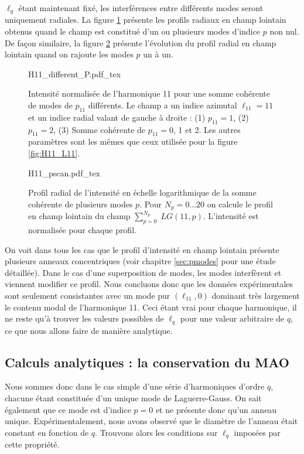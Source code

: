 $\ell_q$ étant maintenant fixé, les interférences entre différents modes seront uniquement radiales. 
La figure \ref{Fig:H11_pmodes} présente les profils radiaux en champ lointain obtenus quand le champ est constitué d'un ou plusieurs modes d'indice $p$ non nul. De façon similaire, la figure \ref{Fig:H11_pscan} présente l'évolution du profil radial en champ lointain quand on rajoute les modes $p$ un à un.


\begin{figure}[!ht]
\centering
\def\svgwidth{\columnwidth}
{H11_different_P.pdf_tex}
\caption{Intensité normalisée de l'harmonique 11 pour une somme cohérente de modes de $p_{11}$ différents. Le champ a un indice azimutal $\ell_{11} = 11$ et un indice radial valant de gauche à droite : (1) $p_{11} = 1$, (2) $p_{11} = 2$, (3) Somme cohérente de $p_{11} = 0$, 1 et 2. Les autres paramètres sont les mêmes que ceux utilisée pour la figure \ref{fig:H11_L11}.}
\label{Fig:H11_pmodes}
\end{figure}

\begin{figure}[!ht]
\centering
\def\svgwidth{\columnwidth}
{H11_pscan.pdf_tex}
\caption{Profil radial de l'intensité en échelle logarithmique de la somme cohérente de plusieurs modes $p$. Pour $N_p=0\ldots20$ on calcule le profil en champ lointain du champ $\sum_{p=0}^{N_p}\; LG(11,p)$. L'intensité est normalisée pour chaque profil.}
\label{Fig:H11_pscan}
\end{figure}

On voit dans tous les cas que le profil d'intensité en champ lointain présente plusieurs anneaux concentriques (voir chapitre \ref{sec:pmodes} pour une étude détaillée). Dans le cas d'une superposition de modes, les modes interfèrent et viennent modifier ce profil. Nous concluons donc que les données expérimentales sont seulement consistantes avec un mode pur $(\ell_{11},0)$ dominant très largement le contenu modal de l'harmonique 11. Ceci étant vrai pour chaque harmonique, il ne reste qu'à trouver les valeurs possibles de $\ell_q$ pour une valeur arbitraire de $q$, ce que nous allons faire de manière analytique.

\subsection{Calculs analytiques : la conservation du MAO}
Nous sommes donc dans le cas simple d'une série d'harmoniques d'ordre $q$, chacune étant constituée d'un unique mode de Laguerre-Gauss. On sait également que ce mode est  d'indice $p=0$ et ne présente donc qu'un anneau unique. Expérimentalement, nous avons observé que le diamètre de l'anneau était constant en fonction de $q$. Trouvons alors les conditions sur $\ell_q$ imposées par cette propriété.\\

